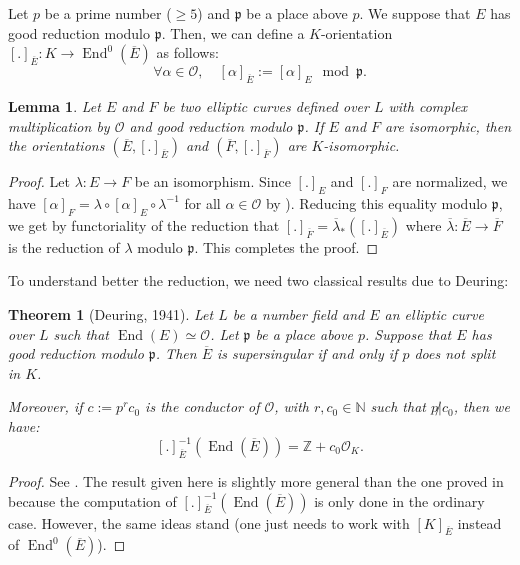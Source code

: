 \documentclass[a4paper,10pt]{report}
\theoremstyle{definition}
\theoremstyle{plain}
\newtheorem{Lemma}[Definition]{Lemma}
\newtheorem{Theorem}[Definition]{Theorem}
\theoremstyle{definition}
\newcommand{\N}{\mathbb{N}}
\newcommand{\Z}{\mathbb{Z}}
\newcommand{\mO}{\mathcal{O}}
\renewcommand{\(}{\left(}
\renewcommand{\)}{\right)}
\newcommand{\mfp}{\mathfrak{p}}
\DeclareMathOperator{\End}{End}
\begin{document}
Let $p$ be a prime number ($\geq 5$) and $\mfp$ be a place above $p$.  We suppose that $E$ has good reduction modulo $\mfp$. Then, we can define a $K$-orientation $[.]_{\overline{E}}: K\longrightarrow \End^0(\overline{E})$ as follows:
\[\forall \alpha\in \mO, \quad [\alpha]_{\overline{E}}:=[\alpha]_E \mod \mfp.\]

\begin{Lemma}
Let $E$ and $F$ be two elliptic curves defined over $L$ with complex multiplication by $\mO$ and good reduction modulo $\mfp$.  If $E$ and $F$ are isomorphic,  then the orientations $(\overline{E},[.]_{\overline{E}})$ and $(\overline{F},[.]_{\overline{F}})$ are $K$-isomorphic.
\end{Lemma}

\begin{proof}
Let $\lambda : E\longrightarrow F$ be an isomorphism.  Since $[.]_E$ and $[.]_F$ are normalized, we have  $[\alpha]_F=\lambda\circ[\alpha]_E\circ\lambda^{-1}$ for all $\alpha\in\mO$ by \cite[Corollary II.1.1.1]{Silverman2}).  Reducing this equality modulo $\mfp$, we get by functoriality of the reduction that $[.]_{\overline{F}}=\overline{\lambda}_*([.]_{\overline{E}})$ where $\overline{\lambda}:\overline{E}\longrightarrow\overline{F}$ is the reduction of $\lambda$ modulo $\mfp$.  This completes the proof.
\end{proof}

To understand better the reduction, we need two classical results due to Deuring:

\begin{Theorem}[Deuring, 1941]\label{Theorem 1}
Let $L$ be a number field and $E$ an elliptic curve over $L$ such that $\End(E)\simeq \mO$.  Let $\mfp$ be a place above $p$. Suppose that $E$ has good reduction modulo $\mfp$.  Then $\overline{E}$ is supersingular if and only if $p$ does not split in $K$.  

Moreover,  if $c:=p^r c_0$ is the conductor of $\mO$, with $r,c_0\in\N$ such that $p\not|c_0$, then we have:
\[[.]_{\overline{E}}^{-1}(\End(\overline{E}))=\Z+c_0\mO_K.\]
\end{Theorem}

\begin{proof}
See \cite[chapter 13, Theorem 12]{Lang_EF}.  The result given here is slightly more general than the one proved in \cite{Lang_EF} because the computation of $[.]_{\overline{E}}^{-1}(\End(\overline{E}))$ is only done in the ordinary case. However, the same ideas stand (one just needs to work with $[K]_{\overline{E}}$ instead of $\End^0(\overline{E})$).
\end{proof}
\end{document}
